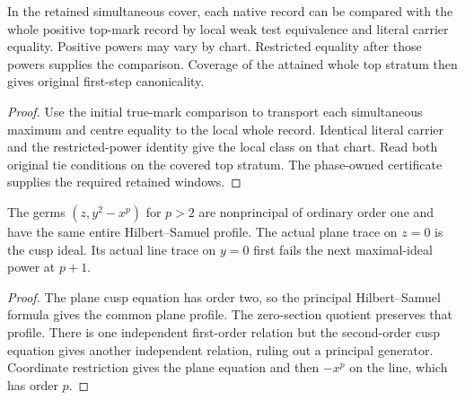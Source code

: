 \begin{theorem}
\label{hir:g8-initial-chartwise-power-cover}
\leanok
In the retained simultaneous cover, each native record can be
compared with the whole positive top-mark record by local weak
test equivalence and literal carrier equality. Positive powers
may vary by chart. Restricted equality after those powers supplies
the comparison. Coverage of the attained whole top stratum then
gives original first-step canonicality.
\end{theorem}
\begin{proof}
Use the initial true-mark comparison to transport each
simultaneous maximum and centre equality to the local whole
record. Identical literal carrier and the restricted-power
identity give the local class on that chart. Read both original
tie conditions on the covered top stratum. The phase-owned
certificate supplies the required retained windows.
\end{proof}

\begin{theorem}
\label{hir:g8-embedded-cusp-contact-orders}
\leanok
The germs $(z,y^2-x^p)$ for $p>2$ are nonprincipal of ordinary
order one and have the same entire Hilbert--Samuel profile.
The actual plane trace on $z=0$ is the cusp ideal. Its actual
line trace on $y=0$ first fails the next maximal-ideal power
at $p+1$.
\end{theorem}
\begin{proof}
The plane cusp equation has order two, so the principal
Hilbert--Samuel formula gives the common plane profile.
The zero-section quotient preserves that profile. There is
one independent first-order relation but the second-order
cusp equation gives another independent relation, ruling out
a principal generator. Coordinate restriction gives the plane
equation and then $-x^p$ on the line, which has order $p$.
\end{proof}

